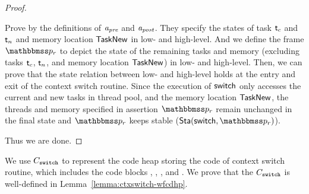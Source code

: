\begin{proof}
\begin{itemize}
        Prove by the definitions of $\textit{a}_\textit{pre}$ and $\textit{a}_\textit{post}$.
        They specify the states of task $\textsf{t}_c$ and
        $\textsf{t}_n$ and memory location $\mathsf{TaskNew}$
        in low- and high-level. And we define the frame
        $\relastP_r$ to depict the state of the
        remaining tasks and memory
        (excluding tasks $\textsf{t}_c$, $\textsf{t}_n$, and
        memory location $\mathsf{TaskNew}$) in low- and high-level.
        Then, we can prove that the
        state relation between low- and high-level
        holds at the entry and
        exit of the context switch routine.
        Since the execution of $\mathsf{switch}$ only accesses
        the current and new tasks in thread pool, and the
        memory location $\mathsf{TaskNew}$,
        the threads and memory specified in assertion
        $\relastP_r$ remain unchanged
        in the final state and $\relastP_r$ keeps
        stable ($\Sta(\primsw, \relastP_r)$).
    \end{itemize}
    Thus we are done.
\end{proof}

We use $C_{\texttt{switch}}$ to represent the
code heap storing the code of context switch routine,
which includes the code blocks \SwitchEntry{},
\regsave{}, \regrestore{},
\SaveUsedWin{} and \SwitchNewTask{}. We prove that
the $C_{\texttt{switch}}$ is well-defined in
Lemma~\ref{lemma:ctxswitch-wfcdhp}.

